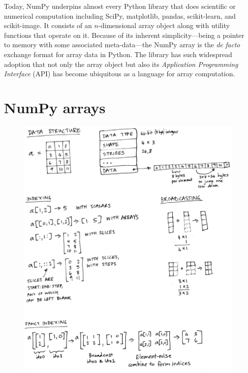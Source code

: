 Today, NumPy underpins almost every Python library that does scientific or
numerical computation including SciPy\cite{virtanen2019scipy},
matplotlib\cite{hunter2007matplotlib}, pandas\cite{mckinney-proc-scipy-2010},
scikit-learn\cite{pedregosa2011scikit}, and
scikit-image\cite{vanderwalt2014scikit}.
It consists of an $n$-dimensional array object along with utility functions
that operate on it.
Because of its inherent simplicity---being a pointer to memory with some
associated meta-data---the NumPy array is
the {\it de facto} exchange format for array data in Python.
The library has such widespread adoption that not only the array object but also its
{\it Application Programming Interface} (API) has become ubiquitous as
a language for array computation.


\section*{NumPy arrays}

\begin{figure}
  \centering
  \includegraphics[width=\textwidth]{static/sketches/array-concepts}
  \caption{
   }
  \label{fig:array-concepts}
\end{figure}


